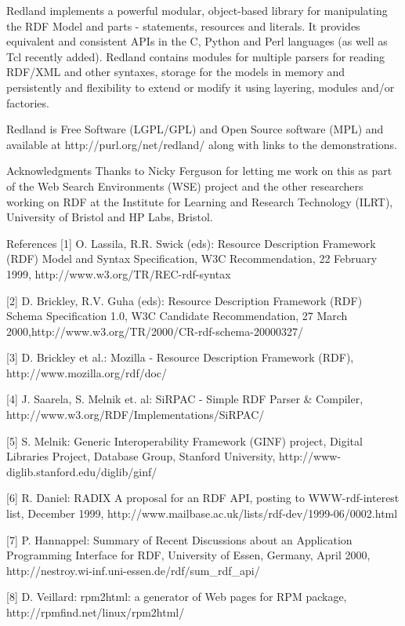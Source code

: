 \documentclass[11pt]{article}
\begin{document}
    Redland implements a powerful modular, object-based library for manipulating the RDF Model and parts - statements, resources and literals. It provides equivalent and consistent APIs in the C, Python and Perl languages (as well as Tcl recently added). Redland contains modules for multiple parsers for reading RDF/XML and other syntaxes, storage for the models in memory and persistently and flexibility to extend or modify it using layering, modules and/or factories.

    Redland is Free Software (LGPL/GPL) and Open Source software (MPL) and available at http://purl.org/net/redland/ along with links to the demonstrations.

    Acknowledgments
    Thanks to Nicky Ferguson for letting me work on this as part of the Web Search Environments (WSE) project and the other researchers working on RDF at the Institute for Learning and Research Technology (ILRT), University of Bristol and HP Labs, Bristol.

    References
    [1] O. Lassila, R.R. Swick (eds): Resource Description Framework (RDF) Model and Syntax Specification, W3C Recommendation, 22 February 1999, http://www.w3.org/TR/REC-rdf-syntax

    [2] D. Brickley, R.V. Guha (eds): Resource Description Framework (RDF) Schema Specification 1.0, W3C Candidate Recommendation, 27 March 2000,http://www.w3.org/TR/2000/CR-rdf-schema-20000327/

    [3] D. Brickley et al.: Mozilla - Resource Description Framework (RDF), http://www.mozilla.org/rdf/doc/

    [4] J. Saarela, S. Melnik et. al: SiRPAC - Simple RDF Parser & Compiler, http://www.w3.org/RDF/Implementations/SiRPAC/

    [5] S. Melnik: Generic Interoperability Framework (GINF) project, Digital Libraries Project, Database Group, Stanford University, http://www-diglib.stanford.edu/diglib/ginf/

    [6] R. Daniel: RADIX A proposal for an RDF API, posting to WWW-rdf-interest list, December 1999, http://www.mailbase.ac.uk/lists/rdf-dev/1999-06/0002.html

    [7] P. Hannappel: Summary of Recent Discussions about an Application Programming Interface for RDF, University of Essen, Germany, April 2000, http://nestroy.wi-inf.uni-essen.de/rdf/sum_rdf_api/

    [8] D. Veillard: rpm2html: a generator of Web pages for RPM package, http://rpmfind.net/linux/rpm2html/
\end{document}
